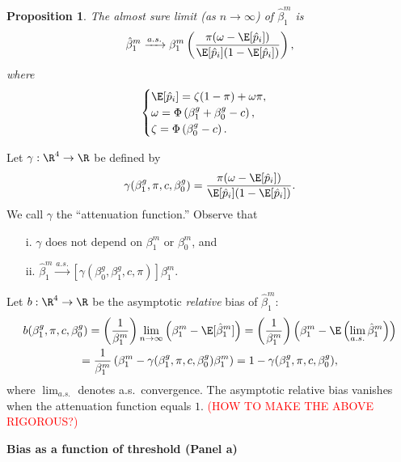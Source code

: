 \documentclass[12pt]{article}
\newtheorem{proposition}{Proposition}
\begin{document}
\begin{proposition}\label{prop:convergence}
 The almost sure limit (as $n \to \infty$) of $\hat{\beta}^m_1$ is
\begin{equation}\label{thresh_est_intercepts}
\hat{\beta}^m_1 \xrightarrow{a.s.} \beta^m_1 \left(\frac{ \pi( \omega - \E[ \hat{p}_i ])}{ \E[\hat{p}_i] (1 - \E[\hat{p}_i])}\right),
\end{equation}
where
$$\begin{cases}
\E[\hat{p}_i] = \zeta(1-\pi) + \omega\pi , \\
\omega = \Phi\left(\beta_1^g + \beta_0^g -c \right) ,\\ \zeta = \Phi\left( \beta^g_0 - c \right). \\
\end{cases}$$
\end{proposition}
Let $\gamma: \R^4 \to \R$ be defined by
$$ \gamma(\beta^g_1, \pi, c, \beta^g_0) = \frac{\pi (\omega - \E[\hat{p}_i])}{\E[\hat{p}_i] (1 - \E[\hat{p}_i]) }.$$ We call $\gamma$ the ``attenuation function.'' Observe that \begin{itemize}
\item[i.] $\gamma$ does not depend on $\beta^m_1$ or $\beta^m_0$, and
\item[ii.] $\hat{\beta}^m_1 \xrightarrow{a.s.} [\gamma(\beta_0^g, \beta_1^g, c, \pi)] \beta^m_1.$
\end{itemize}
Let $b: \R^4 \to \R$ be the asymptotic \textit{relative} bias of $\hat{\beta}^m_1$:
\begin{multline*}
b(\beta^g_1, \pi, c, \beta^g_0) = \left(\frac{1}{\beta^m_1}\right) \lim_{n\to\infty} \left(\beta^m_1 - \E[\hat{\beta}^m_1]\right) = \left( \frac{1}{\beta^m_1}\right)\left(\beta^m_1 - \E \left(\lim_{a.s.} \hat{\beta}^m_1 \right)\right) \\ = \frac{1}{\beta^m_1} \left(\beta^m_1 - \gamma(\beta^g_1, \pi, c, \beta^g_0)\beta^m_1\right) = 1 - \gamma(\beta^g_1, \pi, c, \beta^g_0),
\end{multline*}
where $\lim_{a.s.}$ denotes a.s.\ convergence. The asymptotic relative bias vanishes when the attenuation function equals $1$. \textcolor{red}{(HOW TO MAKE THE ABOVE RIGOROUS?)}

\begin{center}
\textbf{Bias as a function of threshold (Panel a)}
\end{center}
\end{document}
